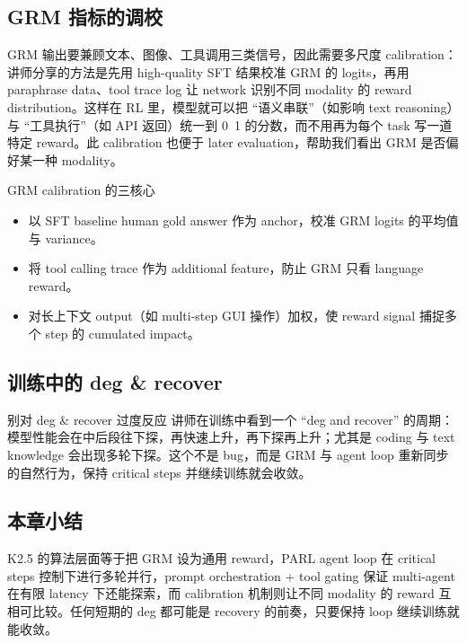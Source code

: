 \subsection{GRM 指标的调校}
GRM 输出要兼顾文本、图像、工具调用三类信号，因此需要多尺度 calibration：讲师分享的方法是先用 high-quality SFT 结果校准 GRM 的 logits，再用 paraphrase data、tool trace log 让 network 识别不同 modality 的 reward distribution。这样在 RL 里，模型就可以把 ``语义串联''（如影响 text reasoning）与 ``工具执行''（如 API 返回）统一到 0~1 的分数，而不用再为每个 task 写一道特定 reward。此 calibration 也便于 later evaluation，帮助我们看出 GRM 是否偏好某一种 modality。

\begin{knowledgebox}{GRM calibration 的三核心}
\begin{itemize}
    \item 以 SFT baseline human gold answer 作为 anchor，校准 GRM logits 的平均值与 variance。
    \item 将 tool calling trace 作为 additional feature，防止 GRM 只看 language reward。
    \item 对长上下文 output（如 multi-step GUI 操作）加权，使 reward signal 捕捉多个 step 的 cumulated impact。
\end{itemize}
\end{knowledgebox}

\subsection{训练中的 deg \& recover}
\begin{warningbox}{别对 deg \& recover 过度反应}
讲师在训练中看到一个 ``deg and recover'' 的周期：模型性能会在中后段往下探，再快速上升，再下探再上升；尤其是 coding 与 text knowledge 会出现多轮下探。这个不是 bug，而是 GRM 与 agent loop 重新同步的自然行为，保持 critical steps 并继续训练就会收敛。
\end{warningbox}

\subsection{本章小结}
K2.5 的算法层面等于把 GRM 设为通用 reward，PARL agent loop 在 critical steps 控制下进行多轮并行，prompt orchestration + tool gating 保证 multi-agent 在有限 latency 下还能探索，而 calibration 机制则让不同 modality 的 reward 互相可比较。任何短期的 deg 都可能是 recovery 的前奏，只要保持 loop 继续训练就能收敛。

